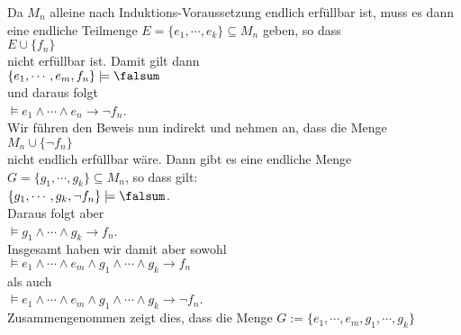 \begin{enumerate}
\begin{enumerate}
        Da $M_n$ alleine nach Induktions-Voraussetzung endlich erfüllbar ist, muss es dann eine
        endliche Teilmenge $E = \{ e_1, \cdots, e_k \} \subseteq M_n$ geben, so dass
        \\[0.2cm]
        \hspace*{1.3cm}
        $E \cup \{ f_n \}$
        \\[0.2cm]
        nicht erfüllbar ist.  Damit gilt dann
        \\[0.2cm]
        \hspace*{1.3cm}
        $\{ e_1, \cdots, e_m, f_n \} \models \falsum$
        \\[0.2cm]
        und daraus folgt
        \\[0.2cm]
        \hspace*{1.3cm}
        $ \models e_1 \wedge \cdots \wedge e_n \rightarrow \neg f_n$.
        \\[0.2cm]
        Wir führen den Beweis nun indirekt und nehmen an, dass die Menge
        \\[0.2cm]
        \hspace*{1.3cm}
        $M_n \cup \{ \neg f_n \}$ 
        \\[0.2cm]
        nicht endlich erfüllbar wäre.  Dann gibt es eine endliche Menge 
        $G = \{ g_1, \cdots, g_k \} \subseteq M_n$,
        so dass gilt:
        \\[0.2cm]
        \hspace*{1.3cm}
        $\{ g_1, \cdots, g_k, \neg f_n \} \models \falsum$.
        \\[0.2cm]
        Daraus folgt aber
        \\[0.2cm]
        \hspace*{1.3cm}
        $\models g_1 \wedge \cdots \wedge g_k \rightarrow f_n$.
        \\[0.2cm]
        Insgesamt haben wir damit aber sowohl
        \\[0.2cm]
        \hspace*{1.3cm}
        $\models e_1 \wedge \cdots \wedge e_m \wedge g_1 \wedge \cdots \wedge g_k \rightarrow f_n$
        \\
        als auch 
        \\[-0.2cm]
        \hspace*{1.3cm}
        $\models e_1 \wedge \cdots \wedge e_m \wedge g_1 \wedge \cdots \wedge g_k \rightarrow \neg f_n$.
        \\[0.2cm]
        Zusammengenommen zeigt dies, dass die Menge $G := \{ e_1, \cdots, e_m, g_1, \cdots, g_k \}$

\end{enumerate}
\end{enumerate}
